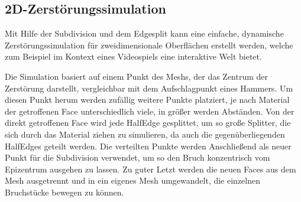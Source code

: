 \subsection {2D-Zerst\"orungssimulation}
Mit Hilfe der Subdivision und dem Edgesplit kann eine einfache, dynamische Zer\-st\"orungs\-simulation f\"ur zweidimensionale Oberfl\"achen erstellt werden, welche zum Beispiel im Kontext eines Videospiels eine interaktive Welt bietet. 

Die Simulation basiert auf einem Punkt des Meshs, der das Zentrum der Zerst\"orung darstellt, vergleichbar mit dem Aufschlagpunkt eines Hammers. Um diesen Punkt herum werden zuf\"allig weitere Punkte platziert, je nach Material der getroffenen Face unterschiedlich viele, in gr\"o{\ss}er werden Abst\"anden. Von der direkt getroffenen Face wird jede HalfEdge gesplittet, um so gro{\ss}e Splitter, die sich durch das Material ziehen zu simulieren, da auch die gegen\"uberliegenden HalfEdges geteilt werden. Die verteilten Punkte werden Anschlie{\ss}end als neuer Punkt f\"ur die Subdivision verwendet, um so den Bruch konzentrisch vom Epizentrum ausgehen zu lassen. Zu guter Letzt werden die neuen Faces aus dem Mesh ausgetrennt und in ein eigenes Mesh umgewandelt, die einzelnen Bruchst\"ucke bewegen zu k\"onnen.

